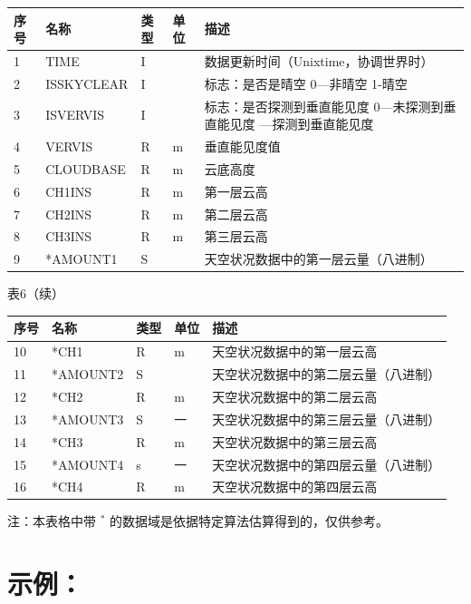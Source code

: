 \documentclass[
  10
]{article}
\begin{document}
\begin{longtable}[]{@{}|l|l|l|l|l|@{}}
\toprule\noalign{}
\endhead
\bottomrule\noalign{}
\endlastfoot
\hline
序号 & 名称 & 类型 & 单位 & 描述 \\
\hline
1 & TIME & I & & 数据更新时间（Unixtime，协调世界时） \\
\hline
2 & ISSKYCLEAR & I & & 标志：是否是晴空 0---非晴空 1-晴空 \\
\hline
3 & ISVERVIS & I & & 标志：是否探测到垂直能见度 0---未探测到垂直能见度
---探测到垂直能见度 \\
\hline
4 & VERVIS & R & m & 垂直能见度值 \\
\hline
5 & CLOUDBASE & R & m & 云底高度 \\
\hline
6 & CH1INS & R & m & 第一层云高 \\
\hline
7 & CH2INS & R & m & 第二层云高 \\
\hline
8 & CH3INS & R & m & 第三层云高 \\
\hline
9 & *AMOUNT1 & S & & 天空状况数据中的第一层云量（八进制） \\
\hline
\end{longtable}

表6（续）

\begin{longtable}[]{@{}|l|l|l|l|l|@{}}
\toprule\noalign{}
\endhead
\bottomrule\noalign{}
\endlastfoot
\hline
序号 & 名称 & 类型 & 单位 & 描述 \\
\hline
10 & *CH1 & R & m & 天空状况数据中的第一层云高 \\
\hline
11 & *AMOUNT2 & S & & 天空状况数据中的第二层云量（八进制） \\
\hline
12 & *CH2 & R & m & 天空状况数据中的第二层云高 \\
\hline
13 & *AMOUNT3 & S & 一 & 天空状况数据中的第三层云量（八进制） \\
\hline
14 & *CH3 & R & m & 天空状况数据中的第三层云高 \\
\hline
15 & *AMOUNT4 & s & 一 & 天空状况数据中的第四层云量（八进制） \\
\hline
16 & *CH4 & R & m & 天空状况数据中的第四层云高 \\
\hline
\end{longtable}

注：本表格中带 \(^ { \ast }\)
的数据域是依据特定算法估算得到的，仅供参考。

\section{示例：}\label{ux793aux4f8b}
\end{document}
